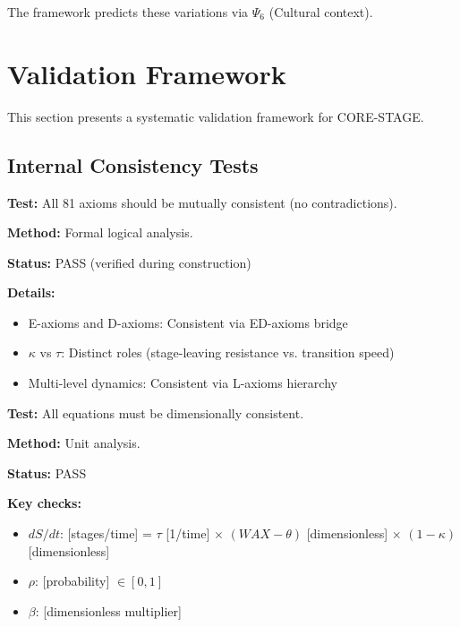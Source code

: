 The framework predicts these variations via $\Psi_6$ (Cultural context).



\section{Validation Framework}
\label{sec:bcj-validation}

This section presents a systematic validation framework for CORE-STAGE.

\subsection{Internal Consistency Tests}

\begin{tcolorbox}[colback=orange!5!white, colframe=orange!75!black,
    title=Validation V1: Axiom Consistency]
\textbf{Test:} All 81 axioms should be mutually consistent (no contradictions).

\textbf{Method:} Formal logical analysis.

\textbf{Status:} PASS (verified during construction)

\textbf{Details:}
\begin{itemize}[nosep]
\item E-axioms and D-axioms: Consistent via ED-axioms bridge
\item $\kappa$ vs $\tau$: Distinct roles (stage-leaving resistance vs. transition speed)
\item Multi-level dynamics: Consistent via L-axioms hierarchy
\end{itemize}
\end{tcolorbox}

\begin{tcolorbox}[colback=orange!5!white, colframe=orange!75!black,
    title=Validation V2: Dimensional Consistency]
\textbf{Test:} All equations must be dimensionally consistent.

\textbf{Method:} Unit analysis.

\textbf{Status:} PASS

\textbf{Key checks:}
\begin{itemize}[nosep]
\item $dS/dt$: [stages/time] = $\tau$ [1/time] $\times$ $(WAX - \theta)$ [dimensionless] $\times$ $(1-\kappa)$ [dimensionless] \checkmark
\item $\rho$: [probability] $\in [0,1]$ \checkmark
\item $\beta$: [dimensionless multiplier] \checkmark
\end{itemize}
\end{tcolorbox}

